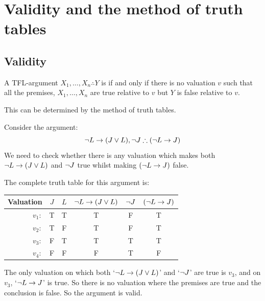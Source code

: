 \chapter{Validity and the method of truth tables}
\section{Validity}

\begin{definition}A TFL-argument $X_1,\ldots,X_n\therefore Y$ is  if and only if there is no valuation $v$ such that all the premises, $X_1,\ldots,X_n$ are true relative to $v$ but $Y$ is false relative to $v$.\end{definition}




This can be determined by the method of truth tables.

Consider the argument:
$$\enot L \eif (J \eor L),\enot J\therefore (\enot L\eif J)$$
We need to check whether there is any valuation which makes both $\neg L \rightarrow (J \vee L)$ and $\neg J$ true whilst making $(\neg L\rightarrow J) $ false. 

The complete truth table for this argument is: 
\begin{center}
	\begin{tabular}{rcc|c|c|c}
		Valuation&$J$&$L$&$\neg L \rightarrow (J \vee L)$&$\neg J$&$(\neg L\rightarrow J)$\\\hline
		$v_1:$&T&T&T&F&T\\
		$v_2:$&T&F&T&F&T\\
		$v_3:$&F&T&T&T&T\\
		$v_4:$&F&F&F&T&F
	\end{tabular}
\end{center}

The only valuation on which both `$\neg L \rightarrow (J \vee L)$' and `$\neg J$' are true is $v_3$, and on $v_3$, `$\neg L\rightarrow J$' is true. So there is no valuation where the premises are true and the conclusion is false. So the argument is valid. 





